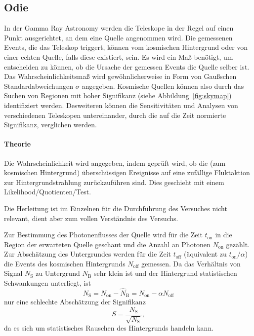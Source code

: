 \subsection{Odie}%
\label{sub:odie}
In der Gamma Ray Astronomy werden die Teleskope in der Regel auf einen Punkt
ausgerichtet, an dem eine Quelle angenommen wird.
Die gemessenen Events, die das Teleskop triggert, können vom
kosmischen Hintergrund oder von einer echten Quelle, falls diese existiert, sein.
Es wird ein Maß benötigt, um entscheiden zu können,
ob die Ursache der gemessen Events die Quelle selber ist.
Das Wahrscheinlichkeitsmaß wird gewöhnlicherweise in Form von Gaußschen
Standardabweichungen $\sigma$ angegeben.
Kosmische Quellen können also
durch das Suchen von Regionen mit hoher Signifikanz (siehe
Abbildung~\ref{fig:skymap})
identifiziert werden.
Desweiteren können die Sensitivitäten und Analysen von verschiedenen
Teleskopen untereinander,
durch die auf die Zeit normierte Signifikanz,
verglichen werden.

\paragraph{Theorie}%

Die Wahrscheinlichkeit wird angegeben, indem geprüft wird,
ob die (zum kosmischen Hintergrund) über\-schüssigen
Ereignisse   auf eine zufällige Fluktaktion zur
Hintergrundstrahlung zurückzuführen sind.
Dies geschieht mit einem Likelihood\-/Quotienten\-/Test.

Die Herleitung ist im Einzelnen für die Durchführung des
Versuches nicht relevant,
dient aber zum vollen Verständnis des Versuchs.

Zur Bestimmung des Photonenflusses der Quelle wird für die Zeit $t_\text{on}$ in die Region der
erwarteten Quelle geschaut und die Anzahl an Photonen $N_\text{on}$ gezählt.
Zur Abschätzung des Untergrundes werden für die Zeit $t_\text{off}$
(äquivalent zu $t_\text{on} / \alpha$)
die Events des kosmischen Hintergrunds $N_\text{off}$ gemessen.
Da das Verhältnis von Signal $N_\text{S}$ zu Untergrund
$N_\text{B}$ sehr klein ist
und der Hintergrund statistischen Schwankungen unterliegt,
ist
\begin{equation}
	N_\text{S} = N_\text{on} - \hat{N}_\text{B} = N_\text{on} - \alpha N_\text{off}
\end{equation}
nur eine schlechte Abschätzung der Signifikanz
\begin{equation}
	S = \frac{N_\text{S}}{\sqrt{N_\text{S}}},
\end{equation}
da es sich um statistisches Rauschen des
Hintergrunds handeln kann.


